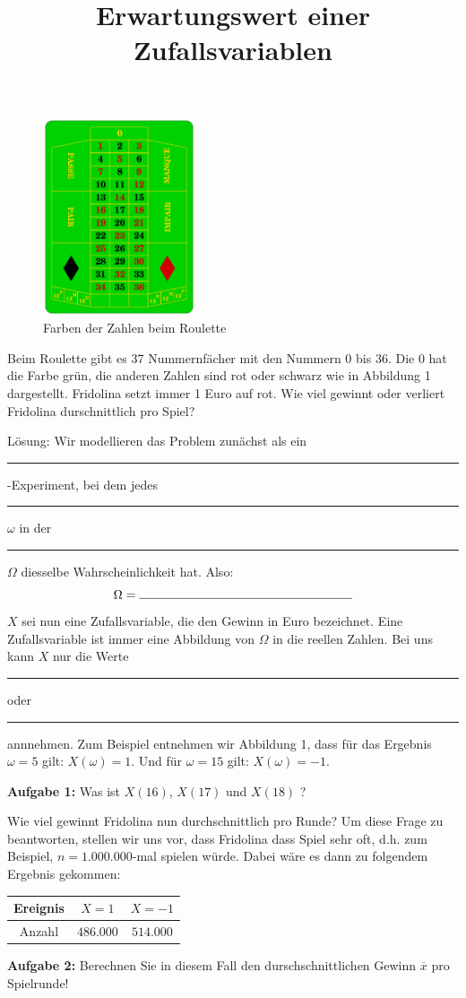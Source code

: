 \documentclass{article}
\title{Erwartungswert einer Zufallsvariablen}
\begin{document}
\setcounter{section}{1}\setcounter{subsection}{0}
 \maketitle 

\begin{figure}
  \includegraphics[width=4.5cm]{Roulette_frz.png}
  \caption{Farben der Zahlen beim Roulette}
\end{figure}
Beim Roulette gibt es 37 Nummernf\"acher mit den Nummern 0 bis 36. Die 0 hat die Farbe gr\"un, die anderen Zahlen sind rot oder schwarz wie in Abbildung 1 dargestellt. Fridolina setzt immer 1 Euro auf rot. Wie viel gewinnt oder verliert Fridolina durschnittlich pro Spiel? 

Lösung: Wir modellieren das Problem zun\"achst als ein \rule{2cm}{.4pt}-Experiment, bei dem jedes \rule{3cm}{.4pt} $\omega$ in der \rule{3cm}{.4pt} $\Omega$ diesselbe Wahrscheinlichkeit hat.
Also: $$\Omega = \rule{6cm}{.4pt} $$
$X$ sei nun eine Zufallsvariable, die den Gewinn in Euro bezeichnet. Eine Zufallsvariable ist immer eine Abbildung von $\Omega$ in die reellen Zahlen. Bei uns kann $X$ nur die Werte \rule{1cm}{.4pt} oder \rule{1cm}{.4pt} annnehmen. Zum Beispiel entnehmen wir Abbildung 1, dass für das Ergebnis $\omega = 5$ gilt: $X\left( \omega \right) = 1$. Und für $\omega = 15$ gilt: $X\left( \omega \right) = -1$.

\textbf{Aufgabe 1:} Was ist $X\left( 16 \right)$, $X\left( 17 \right)$ und $X\left( 18 \right)$ ?
\vspace{1cm}

Wie viel gewinnt Fridolina nun durchschnittlich pro Runde? Um diese Frage zu beantworten, stellen wir uns vor, dass Fridolina dass Spiel sehr oft, d.h. zum Beispiel, $n=1.000.000$-mal spielen würde. Dabei wäre es dann zu folgendem Ergebnis gekommen:
\begin{center}
\renewcommand{\arraystretch}{1.7}
 \begin{tabular}{|c|c|c|}
 \hline
 Ereignis & $X=1$ & $X=-1$ \\
 \hline
 Anzahl & $486.000$ & $514.000$ \\
 \hline
 \end{tabular}
 \end{center}
 \textbf{Aufgabe 2:} Berechnen Sie in diesem Fall den durschschnittlichen Gewinn $\overline{x}$ pro Spielrunde!
\vspace{2cm}
\end{document}
